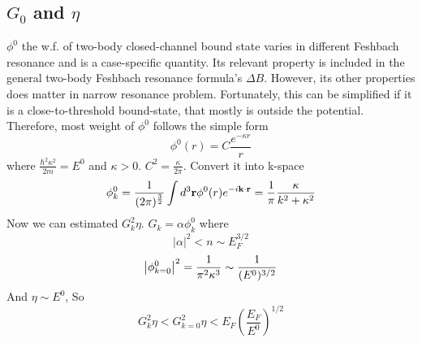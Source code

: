 \subsection{$G_0$ and $\eta$}
%
%
%
$\phi^{0}$ the w.f. of two-body closed-channel bound state varies in different Feshbach resonance and is a case-specific quantity.  Its relevant property is included in the general two-body Feshbach resonance formula's $\Delta{B}$.  However, its other properties does matter in narrow resonance problem.  Fortunately, this can be simplified if it is a close-to-threshold bound-state, that mostly is outside the potential.  Therefore, most weight of $\phi^{0}$ follows the simple form 
\[
\phi^{0}(r)=C\frac{e^{-\kappa{r}}}{r}
\]
 where $\frac{\hbar^{2}\kappa^{2}}{2m}=E^{0}$ and $\kappa>0$.  $C^{2}=\frac{\kappa}{2\pi}$.  Convert it into k-space
 \begin{equation}\label{eq:20101011:phi}
\phi^{0}_k=\frac{1}{(2\pi)^{\frac32}}\int{d^{3}\ensuremath{\mathbf{r}}\phi^{0}(r)e^{-i\ensuremath{\mathbf{k}}\cdot\ensuremath{\mathbf{r}}}}=\frac{1}{\pi}\frac{\kappa}{k^{2}+\kappa^{2}}
\end{equation}
Now we can estimated $G_{k}^{2}\eta$. $G_{k}=\alpha\phi^{0}_{k}$ where 
\[|\alpha|^{2}<n\sim{E_{F}^{3/2}}\]
\[
\left\lvert{\phi^{0}_{k=0}}\right\rvert^{2}=\frac{1}{\pi^{2}\kappa^{3}}\sim\frac{1}{(E^{0})^{3/2}}
\]
And $\eta\sim{E^{0}}$, So 
\[
G_{k}^{2}\eta<G_{k=0}^{2}\eta<E_{F}(\frac{E_{F}}{E^{0}})^{1/2}
\]
